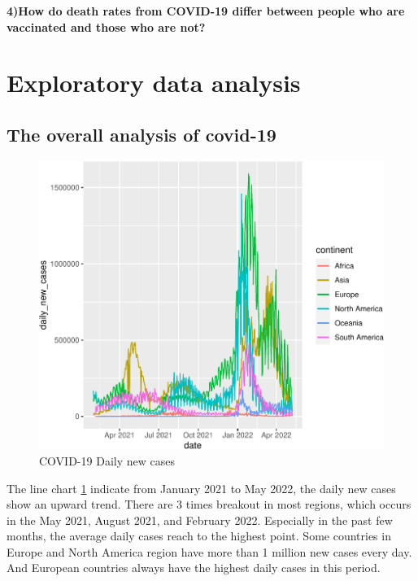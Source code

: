 \documentclass[11pt,a4paper,]{article}
\begin{document}
\textbf{4)How do death rates from COVID-19 differ between people who are vaccinated and those who are not?}

\clearpage

\hypertarget{exploratory-data-analysis}{%
\section{\texorpdfstring{\textbf{Exploratory data analysis}}{Exploratory data analysis}}\label{exploratory-data-analysis}}

\hypertarget{the-overall-analysis-of-covid-19}{%
\subsection{\texorpdfstring{\textbf{The overall analysis of covid-19}}{The overall analysis of covid-19}}\label{the-overall-analysis-of-covid-19}}

\begin{figure}

{\centering \includegraphics{report_files/figure-latex/Figure1-1} 

}

\caption{COVID-19 Daily new cases}\label{fig:Figure1}
\end{figure}

The line chart \ref{fig:Figure1} indicate from January 2021 to May 2022, the daily new cases show an upward trend. There are 3 times breakout in most regions, which occurs in the May 2021, August 2021, and February 2022. Especially in the past few months, the average daily cases reach to the highest point. Some countries in Europe and North America region have more than 1 million new cases every day. And European countries always have the highest daily cases in this period.
\end{document}
